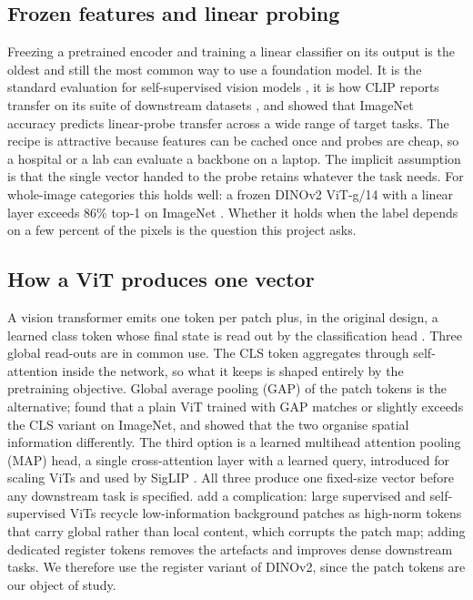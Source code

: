 \documentclass[10pt,letterpaper,twocolumn]{article}
\begin{document}
\subsection{Frozen features and linear probing}
Freezing a pretrained encoder and training a linear classifier on its output is the oldest and
still the most common way to use a foundation model. It is the standard evaluation for
self-supervised vision models \citep{caron2021dino,oquab2024dinov2}, it is how CLIP reports
transfer on its suite of downstream datasets \citep{radford2021clip}, and
\citet{kornblith2019transfer} showed that ImageNet accuracy predicts linear-probe transfer
across a wide range of target tasks. The recipe is attractive because features can be cached
once and probes are cheap, so a hospital or a lab can evaluate a backbone on a laptop. The
implicit assumption is that the single vector handed to the probe retains whatever the task
needs. For whole-image categories this holds well: a frozen DINOv2 ViT-g/14 with a linear
layer exceeds 86\% top-1 on ImageNet \citep{oquab2024dinov2}. Whether it holds when the label
depends on a few percent of the pixels is the question this project asks.

\subsection{How a ViT produces one vector}
A vision transformer emits one token per patch plus, in the original design, a learned class
token whose final state is read out by the classification head \citep{dosovitskiy2021vit}.
Three global read-outs are in common use. The CLS token aggregates through self-attention
inside the network, so what it keeps is shaped entirely by the pretraining objective. Global
average pooling (GAP) of the patch tokens is the alternative; \citet{beyer2022betterplain}
found that a plain ViT trained with GAP matches or slightly exceeds the CLS variant on
ImageNet, and \citet{raghu2021vitcnn} showed that the two organise spatial information differently. The third option is a learned multihead
attention pooling (MAP) head, a single cross-attention layer with a learned query, introduced
for scaling ViTs \citep{zhai2022scaling} and used by SigLIP \citep{zhai2023siglip}. All three produce one fixed-size vector before any downstream task is specified. \citet{darcet2024registers} add a complication:
large supervised and self-supervised ViTs recycle low-information background patches as
high-norm tokens that carry global rather than local content, which corrupts the patch map;
adding dedicated register tokens removes the artefacts and improves dense downstream tasks. We
therefore use the register variant of DINOv2, since the patch tokens are our object of study.
\end{document}
